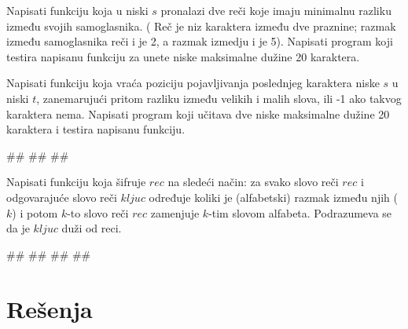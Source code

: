 \begin{Exercise}[label=p2.3_] 
Napisati funkciju
 koja u niski $s$ pronalazi dve reči koje imaju minimalnu razliku između
svojih samoglasnika.  ( Reč je niz karaktera između dve praznine;
razmak između samoglasnika reči  i  je 2,
a razmak izmedju  i  je 5). Napisati program koji testira napisanu funkciju za unete niske maksimalne dužine 20 karaktera.

\end{Exercise}
\ifresenja
\begin{Answer}[ref=p2.3_]
\end{Answer}
\fi


\begin{Exercise}[label=p2.3_] 
Napisati funkciju  koja vraća poziciju pojavljivanja poslednjeg karaktera niske $s$ u niski $t$, zanemarujući pritom razliku između velikih i
malih slova, ili -1 ako takvog karaktera nema. Napisati program koji učitava dve niske maksimalne dužine 20 karaktera i testira napisanu funkciju.


\begin{miditest}
\begin{upotreba}{1}
#\naslovInt#
##
##
\end{upotreba}
\end{miditest}
\end{Exercise}
\ifresenja
\begin{Answer}[ref=p2.3_]
\end{Answer}
\fi





\begin{Exercise}[label=p2.3_] 
Napisati funkciju  koja šifruje $rec$ na sledeći način: za svako slovo reči
$rec$ i odgovarajuće slovo reči $kljuc$ određuje koliki je
(alfabetski) razmak između njih ($k$) i potom  $k$-to slovo reči $rec$ zamenjuje $k$-tim slovom alfabeta. Podrazumeva se da je $kljuc$ duži od reci. 


\begin{miditest}
\begin{upotreba}{1}
#\naslovInt#
##
##
##
\end{upotreba}
\end{miditest}
\end{Exercise}
\ifresenja
\begin{Answer}[ref=p2.3_]
\end{Answer}
\fi

\begin{comment}

\end{comment}
\fi

\ifresenja
\section{Rešenja}
\shipoutAnswer
\fi

